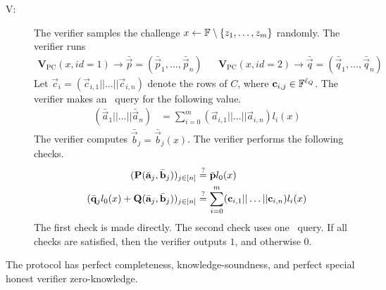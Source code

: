 \begin{description}
\item[V:] The verifier samples the challenge $x \gets \mathbb{F}\setminus\{z_1,\ldots,z_m\}$ randomly.
The verifier runs
\begin{align*}
\textbf{V}_\mathrm{PC}(x,id=1) \to \bar{\vec{p}}=(\bar{\vec{p}}_1,\ldots,\bar{\vec{p}}_n) &&
\textbf{V}_\mathrm{PC}(x,id=2) \to \bar{\vec{q}}=(\bar{\vec{q}}_1,\ldots,\bar{\vec{q}}_n)
\end{align*}
Let $\vec{c}_i = (\vec{c}_{i,1}|| \ldots || \vec{c}_{i,n} )$ denote the rows of $C$, where $\mathbf{c}_{i,j} \in \mathbb{F}^{\ell_Q}$. The verifier makes an \ILCopen\ query for the following value.
\begin{align*}
(\bar{\vec{a}}_1||\ldots||\bar{\vec{a}}_n) &= \sum_{i=0}^m ( \vec{a}_{i,1}||\ldots||\vec{a}_{i,n}) {l_i(x)}
\end{align*}
The verifier computes $\bar{\vec{b}}_j=\bar{\vec{b}}_j(x)$. The verifier performs the following checks.
\begin{align*}
(\mathbf{P}(\bar{\mathbf{a}}_j,\bar{\mathbf{b}}_j))_{j \in [n]} &\overset{?}{=} \bar{\mathbf{p}} l_0(x) \\
(\bar{\mathbf{q}}_jl_0(x)+\mathbf{Q}(\bar{\mathbf{a}}_j,\bar{\mathbf{b}}_j))_{j \in [n]} &\overset{?}{=} \sum_{i=0}^m ( \mathbf{c}_{i,1}||\ldots||\mathbf{c}_{i,n}) {l_i(x)}
\end{align*}
The first check is made directly. The second check uses one \ILCcheck\ query.
If all checks are satisfied, then the verifier outputs $1$, and otherwise $0$.
\end{description}

\begin{lemma} \label{proofmultiversion}
The protocol has perfect completeness, knowledge-soundness, and perfect special honest verifier zero-knowledge.
\end{lemma}

